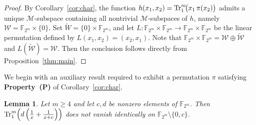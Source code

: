 \documentclass[12pt]{article}
\theoremstyle{plain}
\newtheorem{lemma}{Lemma}
\theoremstyle{definition}
\renewcommand{\to}{\rightarrow}
\newcommand{\Tr}{{\rm Tr}}
\begin{document}
	\begin{proof}
		By Corollary~\ref{cor:char}, the function $h(x_1,x_2)=\Tr_{1}^{m}\!\bigl(x_1\,\pi(x_2)\bigr)$
		admits a unique \(\mathcal{M}\)-subspace containing all nontrivial
		\(\mathcal{M}\)-subspaces of \(h\), namely $ \mathcal{W}= \mathbb{F}_{2^m}\times \{0\}$.
		Set \(\widetilde{W}=\{0\}\times \mathbb{F}_{2^m}\), and let
		\(L:\mathbb{F}_{2^m}\times\mathbb{F}_{2^m}\to
		\mathbb{F}_{2^m}\times\mathbb{F}_{2^m}\)
		be the linear permutation defined by
		\(L(x_1,x_2)=(x_2,x_1)\). Note that $\mathbb{F}_{2^m}\times\mathbb{F}_{2^m}
		=\mathcal{W} \oplus \widetilde{\mathcal{W}}$ and $L(\widetilde{\mathcal{W}} )=\mathcal{W} $.
		Then the conclusion follows directly from Proposition~\ref{thm:main}.
	\end{proof}
	
	We begin with an auxiliary result required to exhibit a permutation
	\(\pi\) satisfying \textbf{Property~(P)} of
	Corollary~\ref{cor:char}.
	
	\begin{lemma}	\label{lem:trace}
		Let $m \geq 4$ and let $c,d$ be nonzero elements of $\mathbb{F}_{2^m}$.  
		Then $\Tr_{1}^{m}\!\left(d\left(\tfrac{1}{x}+\tfrac{1}{x+c}\right)\right) $
		does not vanish identically on
		\(\mathbb{F}_{2^m}\setminus\{0,c\}\).
	\end{lemma}
	
\end{document}
